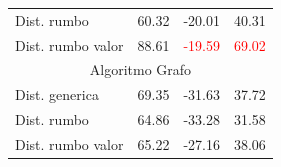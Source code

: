 \documentclass[12pt,a4paper]{article}
\begin{document}
\begin{table}[H]
\begin{tabular}{l|c|l|c|}
\rowcolor[rgb]{0.855,0.91,0.988} Dist. rumbo                           & \textcolor[rgb]{0,0.502,0}{60.32} & -20.01                             & 40.31                              \\
\rowcolor[rgb]{0.925,0.957,1} Dist. rumbo valor                        & 88.61                             & \textcolor{red}{-19.59}            & \textcolor{red}{69.02}             \\ 
\hline
\multicolumn{4}{c}{{\cellcolor[rgb]{0.796,0.808,0.984}}Algoritmo Grafo}                                                                                                              \\ 
\hline
\rowcolor[rgb]{0.925,0.957,1} Dist. generica                           & 69.35                             & -31.63                             & 37.72                              \\
\rowcolor[rgb]{0.855,0.91,0.988} Dist. rumbo                           & 64.86                             & \textcolor[rgb]{0,0.502,0}{-33.28} & \textcolor[rgb]{0,0.502,0}{31.58}  \\
\rowcolor[rgb]{0.925,0.957,1} Dist. rumbo valor                        & 65.22                             & -27.16                             & 38.06                             
\end{tabular}
\end{table}
\end{document}
